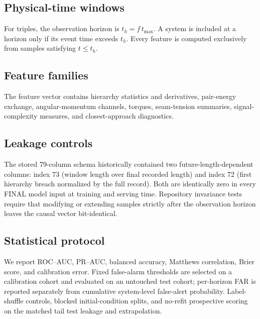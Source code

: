 \subsection{Physical-time windows}
For triples, the observation horizon is $t_h=f\,t_{\max}$. A system is included
at a horizon only if its event time exceeds $t_h$. Every feature is computed
exclusively from samples satisfying $t\le t_h$.

\subsection{Feature families}
The feature vector contains hierarchy statistics and derivatives, pair-energy
exchange, angular-momentum channels, torques, seam-tension summaries,
signal-complexity measures, and closest-approach diagnostics.

\subsection{Leakage controls}
The stored 79-column schema historically contained two future-length-dependent
columns: index 73 (window length over final recorded length) and index 72
(first hierarchy breach normalized by the full record). Both are identically
zero in every FINAL model input at training and serving time. Repository
invariance tests require that modifying or extending samples strictly after the
observation horizon leaves the causal vector bit-identical.

\subsection{Statistical protocol}
We report ROC--AUC, PR--AUC, balanced accuracy, Matthews correlation, Brier
score, and calibration error. Fixed false-alarm thresholds are selected on a
calibration cohort and evaluated on an untouched test cohort; per-horizon FAR
is reported separately from cumulative system-level false-alert probability.
Label-shuffle controls, blocked initial-condition splits, and no-refit
prospective scoring on the matched tail test leakage and extrapolation.

